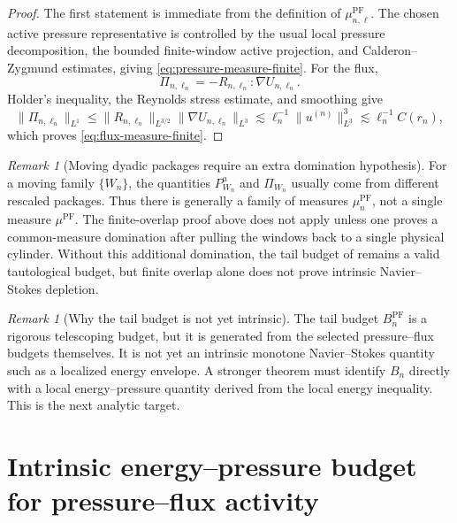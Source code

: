 \documentclass[11pt]{article}
\numberwithin{equation}{section}
\theoremstyle{plain}
\theoremstyle{definition}
\theoremstyle{remark}
\newtheorem{remark}[theorem]{Remark}
\newcommand{\PF}{\mathrm{PF}}
\begin{document}
\begin{proof}
The first statement is immediate from the definition of \(\mu_{n,\ell}^{\PF}\).
The chosen active pressure representative is controlled by the usual local pressure decomposition, the bounded finite-window active projection, and Calderon--Zygmund estimates, giving \eqref{eq:pressure-measure-finite}.  For the flux,
\[
        \Pi_{n,\ell_n}=-R_{n,\ell_n}:\nabla U_{n,\ell_n}.
\]
Holder's inequality, the Reynolds stress estimate, and smoothing give
\[
        \|\Pi_{n,\ell_n}\|_{L^1}
        \le
        \|R_{n,\ell_n}\|_{L^{3/2}}
        \|\nabla U_{n,\ell_n}\|_{L^3}
        \lesssim
        \ell_n^{-1}\|u^{(n)}\|_{L^3}^3
        \lesssim
        \ell_n^{-1}C(r_n),
\]
which proves \eqref{eq:flux-measure-finite}.
\end{proof}

\begin{remark}[Moving dyadic packages require an extra domination hypothesis]
\label{rem:moving-packages-not-one-measure}
For a moving family \(\{W_n\}\), the quantities
\(P^a_{W_n}\) and \(\Pi_{W_n}\) usually come from different rescaled packages.
Thus there is generally a family of measures \(\mu_n^{\PF}\), not a single
measure \(\mu^{\PF}\).  The finite-overlap proof above does not apply unless
one proves a common-measure domination after pulling the windows back to a
single physical cylinder.  Without this additional domination, the tail budget
of  remains a valid tautological budget, but
finite overlap alone does not prove intrinsic Navier--Stokes depletion.
\end{remark}

\begin{remark}[Why the tail budget is not yet intrinsic]
The tail budget \(B_n^{\PF}\) is a rigorous telescoping budget, but it is generated from the selected pressure--flux budgets themselves.  It is not yet an intrinsic monotone Navier--Stokes quantity such as a localized energy envelope.  A stronger theorem must identify \(B_n\) directly with a local energy--pressure quantity derived from the local energy inequality.  This is the next analytic target.
\end{remark}

\section{Intrinsic energy--pressure budget for pressure--flux activity}
\label{sec:intrinsic-energy-pressure-budget}
\end{document}
